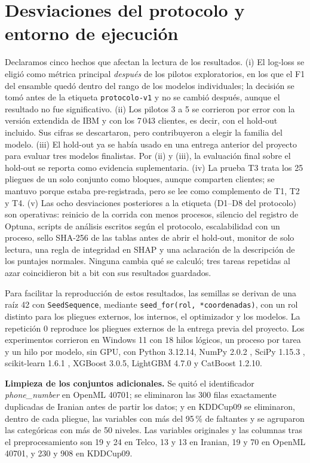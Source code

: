 \documentclass[11pt,a4paper]{article}
\begin{document}
\section{Desviaciones del protocolo y entorno de ejecución}\label{app:desviaciones}
Declaramos cinco hechos que afectan la lectura de los resultados. (i) El log-loss se eligió como métrica principal \emph{después} de los pilotos exploratorios, en los que el F1 del ensamble quedó dentro del rango de los modelos individuales; la decisión se tomó antes de la etiqueta \texttt{protocolo-v1} y no se cambió después, aunque el resultado no fue significativo. (ii) Los pilotos 3 a 5 se corrieron por error con la versión extendida de IBM y con los 7\,043 clientes, es decir, con el hold-out incluido. Sus cifras se descartaron, pero contribuyeron a elegir la familia del modelo. (iii) El hold-out ya se había usado en una entrega anterior del proyecto para evaluar tres modelos finalistas. Por (ii) y (iii), la evaluación final sobre el hold-out se reporta como evidencia suplementaria. (iv) La prueba T3 trata los 25 pliegues de un solo conjunto como bloques, aunque comparten clientes; se mantuvo porque estaba pre-registrada, pero se lee como complemento de T1, T2 y T4. (v) Las ocho desviaciones posteriores a la etiqueta (D1--D8 del protocolo) son operativas: reinicio de la corrida con menos procesos, silencio del registro de Optuna, scripts de análisis escritos según el protocolo, escalabilidad con un proceso, sello SHA-256 de las tablas antes de abrir el hold-out, monitor de solo lectura, una regla de integridad en SHAP y una aclaración de la descripción de los puntajes normales. Ninguna cambia qué se calculó; tres tareas repetidas al azar coincidieron bit a bit con sus resultados guardados.

Para facilitar la reproducción de estos resultados, las semillas se derivan de una raíz 42 con \texttt{SeedSequence}, mediante \texttt{seed\_for(rol, *coordenadas)}, con un rol distinto para los pliegues externos, los internos, el optimizador y los modelos. La repetición 0 reproduce los pliegues externos de la entrega previa del proyecto. Los experimentos corrieron en Windows 11 con 18 hilos lógicos, un proceso por tarea y un hilo por modelo, sin GPU, con Python 3.12.14, NumPy 2.0.2 \cite{harris2020}, SciPy 1.15.3 \cite{virtanen2020}, scikit-learn 1.6.1 \cite{pedregosa2011}, XGBoost 3.0.5, LightGBM 4.7.0 y CatBoost 1.2.10.

\textbf{Limpieza de los conjuntos adicionales.} Se quitó el identificador \emph{phone\_number} en OpenML 40701; se eliminaron las 300 filas exactamente duplicadas de Iranian antes de partir los datos; y en KDDCup09 se eliminaron, dentro de cada pliegue, las variables con más del 95\,\% de faltantes y se agruparon las categóricas con más de 50 niveles. Las variables originales y las columnas tras el preprocesamiento son 19 y 24 en Telco, 13 y 13 en Iranian, 19 y 70 en OpenML 40701, y 230 y 908 en KDDCup09.
\end{document}
